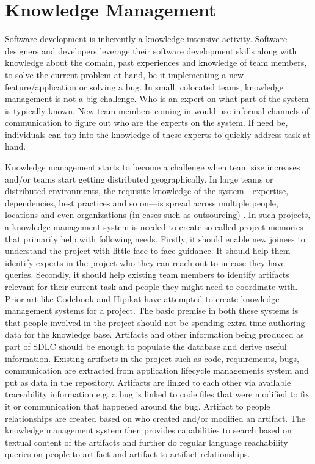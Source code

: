 
\section{Knowledge Management}
\label{sec:km}

Software development is inherently a knowledge intensive activity. Software designers and developers leverage their software development skills along with knowledge about the domain, past experiences and knowledge of team members, to solve the current problem at hand, be it implementing a new feature/application or solving a bug. 
In small, colocated teams, knowledge management is not a big challenge. Who is an expert on what part of the system is typically known. New team members coming in would use informal channels of communication to figure out who are the experts on the system. If need be, individuals can tap into the knowledge of these experts to quickly address task at hand. 

Knowledge management starts to become a challenge when team size increases and/or teams start getting distributed geographically. In large teams or distributed environments, the requisite knowledge of the system---expertise, dependencies, best practices and so on---is spread across multiple people, locations and even organizations (in cases such as outsourcing) \cite{Desouza:2006}. In such projects, a knowledge management system is needed to create so called project memories that primarily help with following needs. Firstly, it should enable new joinees to understand the project with little face to face guidance. It should help them identify experts in the project who they can reach out to in case they have queries. Secondly, it should help existing team members to identify artifacts relevant for their current task and people they might need to coordinate with. Prior art like Codebook \cite{} and Hipikat \cite{} have attempted to create knowledge management systems for a project. The basic premise in both these systems is that people involved in the project should not be spending extra time authoring data for the knowledge base. Artifacts and other information being produced as part of SDLC should be enough to populate the database and derive useful information. Existing artifacts in the project such as code, requirements, bugs, communication are extracted from application lifecycle managements system and put as data in the repository. Artifacts are linked to each other via available traceability information e.g. a bug is linked to code files that were modified to fix it or communication that happened around the bug. Artifact to people relationships are created based on who created and/or modified an artifact. The knowledge management system then provides capabilities to search based on textual content of the artifacts and further do regular language reachability queries on people to artifact and artifact to artifact relationships. 

